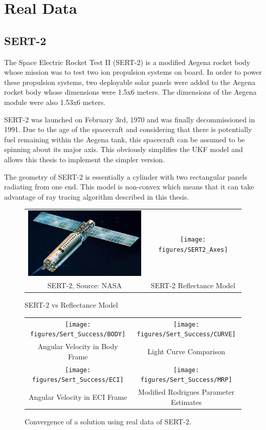 \section{Real Data}

\subsection{SERT-2}

The Space Electric Rocket Test II (SERT-2) is a modified Aegena rocket body whose mission was to test two ion propulsion systems on board. \cite{sert2} In order to power these propulsion systems, two deployable solar panels were added to the Aegena rocket body whose dimensions were 1.5x6 meters. The dimensions of the Aegena module were also 1.53x6 meters.

SERT-2 was launched on February 3rd, 1970 and was finally decommissioned in 1991. Due to the age of the spacecraft and considering that there is potentially fuel remaining within the Aegena tank, this spacecraft can be assumed to be spinning about its major axis. This obviously simplifies the UKF model and allows this thesis to implement the simpler version.

The geometry of SERT-2 is essentially a cylinder with two rectangular panels radiating from one end. This model is non-convex which means that it can take advantage of ray tracing algorithm described in this thesis. 

\begin{figure}\label{sert_model}
	\begin{tabular}{cc}
	\includegraphics[width = 80mm]{figures/sert-2} & \texttt{[image: figures/SERT2\_Axes]} \\
	SERT-2, Source: NASA & SERT-2 Reflectance Model 
	
	\end{tabular}
	\caption{SERT-2 vs Reflectance Model}
\end{figure}

\begin{figure}
	\begin{tabular}{cc}
		\texttt{[image: figures/Sert\_Success/BODY]} &
		\texttt{[image: figures/Sert\_Success/CURVE]} \\
		Angular Velocity in Body Frame & Light Curve Comparison \\
		\texttt{[image: figures/Sert\_Success/ECI]} &
		\texttt{[image: figures/Sert\_Success/MRP]} \\
		Angular Velocity in ECI Frame & Modified Rodrigues Parameter Estimates
	\end{tabular}
	\caption{Convergence of a solution using real data of SERT-2.}
\end{figure}

